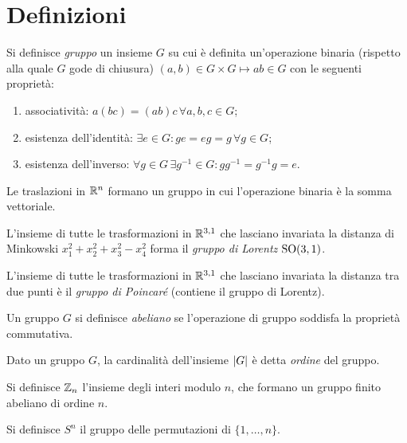 
\section{Definizioni}

\begin{definition}
	Si definisce \textit{gruppo} un insieme $ G $ su cui è definita un'operazione binaria (rispetto alla quale $ G $ gode di chiusura) $ \left( a,b \right) \in G \times G \mapsto ab \in G $ con le seguenti proprietà:
	\begin{enumerate}
		\item associatività: $ a(bc) = (ab)c \,\forall a,b,c \in G $;
		\item esistenza dell'identità: $ \exists e \in G : ge = eg = g \,\forall g \in G $;
		\item esistenza dell'inverso: $ \forall g \in G \,\exists g^{-1} \in G : g g^{-1} = g^{-1} g = e $.
	\end{enumerate}
\end{definition}

\begin{example}
	Le traslazioni in $ \mathbb{R}^n $ formano un gruppo in cui l'operazione binaria è la somma vettoriale.
\end{example}
\begin{example}
	L'insieme di tutte le trasformazioni in $ \mathbb{R}^{3,1} $ che lasciano invariata la distanza di Minkowski $ x_1^2 + x_2^2 + x_3^2 - x_4^2 $ forma il \textit{gruppo di Lorentz} $ \mathrm{SO}(3,1) $.
\end{example}
\begin{example}
	L'insieme di tutte le trasformazioni in $ \mathbb{R}^{3,1} $ che lasciano invariata la distanza tra due punti è il \textit{gruppo di Poincaré} (contiene il gruppo di Lorentz).
\end{example}

\begin{definition}
	Un gruppo $ G $ si definisce \textit{abeliano} se l'operazione di gruppo soddisfa la proprietà commutativa.
\end{definition}

\begin{definition}
	Dato un gruppo $ G $, la cardinalità dell'insieme $ \left\lvert G\right\rvert $ è detta \textit{ordine} del gruppo.
\end{definition}

\begin{example}
	Si definisce $ \mathbb{Z}_n $ l'insieme degli interi modulo $ n $, che formano un gruppo finito abeliano di ordine $ n $.
\end{example}
\begin{example}
	Si definisce $ S^n $ il gruppo delle permutazioni di $ \{1,\dots,n\} $.
\end{example}

